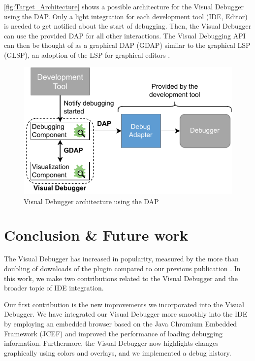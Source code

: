 \documentclass[sigconf]{acmart}
\begin{document}
\autoref{fig:Target_Architecture} shows a possible architecture for the Visual Debugger using the DAP.
Only a light integration for each development tool (IDE, Editor) is needed to get notified about the start of debugging.
Then, the Visual Debugger can use the provided DAP for all other interactions.
The Visual Debugging API can then be thought of as a graphical DAP (GDAP) similar to the graphical LSP (GLSP), an adoption of the LSP for graphical editors \cite{rodriguez-echeverriaLanguageServerProtocol2018,borkVisionFlexibleGLSPBased2024}.

\begin{figure}[ht]
  \centering
  \includegraphics[width=0.8\linewidth]{images/visual-debugger-Target-architecture.pdf}
  \caption{Visual Debugger architecture using the DAP}
  \label{fig:Target_Architecture}
\end{figure}

\section{Conclusion \& Future work} \label{sec:conclusion}
The Visual Debugger has increased in popularity, measured by the more than doubling of downloads of the plugin compared to our previous publication \cite{krauterVisualDebuggerTool2022}.
In this work, we make two contributions related to the Visual Debugger and the broader topic of IDE integration.

Our first contribution is the new improvements we incorporated into the Visual Debugger.
We have integrated our Visual Debugger more smoothly into the IDE by employing an embedded browser based on the Java Chromium Embedded Framework (JCEF) and improved the performance of loading debugging information.
Furthermore, the Visual Debugger now highlights changes graphically using colors and overlays, and we implemented a debug history.
\end{document}
